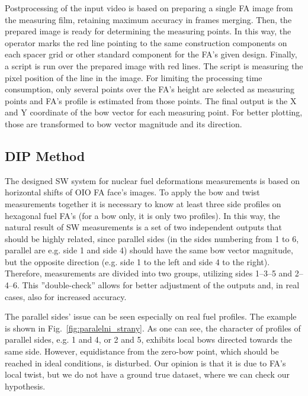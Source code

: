 \documentclass[preprint,12pt]{elsarticle}
\begin{document}
Postprocessing of the input video is based on preparing a single \ac{FA} image from the measuring film, retaining maximum accuracy in frames merging. Then, the prepared image is ready for determining the measuring points. In this way, the operator marks the red line pointing to the same construction components on each spacer grid or other standard component for the \ac{FA}'s given design. Finally, a script is run over the prepared image with red lines. The script is measuring the pixel position of the line in the image. For limiting the processing time consumption, only several points over the \ac{FA}'s height are selected as measuring points and \ac{FA}'s profile is estimated from those points. The final output is the X and Y coordinate of the bow vector for each measuring point. For better plotting, those are transformed to bow vector magnitude and its direction.

\subsection{DIP Method}

The designed \ac{SW} system for nuclear fuel deformations measurements is based on horizontal shifts of \ac{OIO} \ac{FA} face’s images. To apply the bow and twist measurements together it is necessary to know at least three side profiles on hexagonal fuel \ac{FA}’s (for a bow only, it is only two profiles). In this way, the natural result of \ac{SW} measurements is a set of two independent outputs that should be highly related, since parallel sides (in the sides numbering from 1 to 6, parallel are e.g. side 1 and side 4) should have the same bow vector magnitude, but the opposite direction (e.g. side 1 to the left and side 4 to the right). Therefore, measurements are divided into two groups, utilizing sides 1--3--5 and 2--4--6. This ”double-check” allows for better adjustment of the outputs and, in real cases, also for increased accuracy. 

The parallel sides’ issue can be seen especially on real fuel profiles. The example is shown in Fig.~\ref{fig:paralelni_strany}. As one can see, the character of profiles of parallel sides, e.g. 1 and 4, or 2 and 5, exhibits local bows directed towards the same side. However, equidistance from the zero-bow point, which should be reached in ideal conditions, is disturbed. Our opinion is that it is due to \ac{FA}’s local twist, but we do not have a ground true dataset, where we can check our hypothesis.
\end{document}

